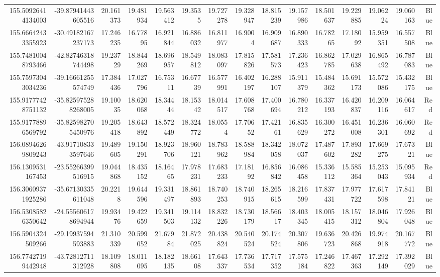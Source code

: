 \begin{center}
\begin{longtable}{rrrrrrrrrrrrrrr}
155.50926414134003 & -39.87941443605516 & 20.161373 & 19.481934 & 19.563412 & 19.3535 & 19.727278 & 19.328947 & 18.815239 & 19.157986 & 18.501637 & 19.229885 & 19.06224 & 19.060163 & Blue \\
155.66642433355923 & -30.49182167237173 & 17.246235 & 16.77895 & 16.921844 & 16.886032 & 16.811977 & 16.9004 & 16.909687 & 16.890333 & 16.78265 & 17.18092 & 15.959351 & 16.557508 & Blue \\
155.74810048793466 & -42.82746318744498 & 19.23729 & 18.844269 & 18.696957 & 18.549812 & 18.083097 & 17.815826 & 17.581573 & 17.236423 & 16.862785 & 17.029638 & 16.865492 & 16.787083 & Blue \\
155.75973043034236 & -39.16661255574749 & 17.384436 & 17.027796 & 16.75311 & 16.67739 & 16.577991 & 16.402197 & 16.288107 & 15.911379 & 15.484362 & 15.691173 & 15.572086 & 15.432175 & Blue \\
155.91777428751132 & -35.825975288268005 & 19.10035 & 18.620068 & 18.34444 & 18.15342 & 18.014517 & 17.608768 & 17.400694 & 16.780212 & 16.337193 & 16.420837 & 16.209116 & 16.064617 & Red \\
155.91778896569792 & -35.825982705450976 & 19.205418 & 18.643892 & 18.572449 & 18.324772 & 18.0554 & 17.70652 & 17.42161 & 16.835629 & 16.300272 & 16.451008 & 16.236301 & 16.060692 & Red \\
156.08946269809243 & -43.917108333597646 & 19.489605 & 19.150291 & 18.923706 & 18.960121 & 18.783962 & 18.588984 & 18.342058 & 18.072037 & 17.487602 & 17.893282 & 17.669275 & 17.67321 & Blue \\
156.1309531167453 & -23.55266399516915 & 19.044868 & 18.435152 & 18.16465 & 17.978231 & 17.683233 & 17.18192 & 16.856842 & 16.086458 & 15.336112 & 15.585364 & 15.253043 & 15.095934 & Red \\
156.30609371925286 & -35.67130335611048 & 20.2218 & 19.644596 & 19.331497 & 18.861893 & 18.740253 & 18.740915 & 18.265615 & 18.216599 & 17.837431 & 17.977722 & 17.617598 & 17.84121 & Blue \\
156.53085826350642 & -24.555606178694944 & 19.93476 & 19.422659 & 19.341503 & 19.114132 & 18.832226 & 18.730179 & 18.56617 & 18.403345 & 18.005415 & 18.157312 & 18.046804 & 17.926048 & Blue \\
156.5904324509266 & -29.19937594593883 & 21.310339 & 20.599052 & 21.67984 & 21.872025 & 20.438824 & 20.540524 & 20.174524 & 20.307806 & 19.636723 & 20.426868 & 19.974918 & 20.167772 & Blue \\
156.77427199442948 & -43.72812711312928 & 18.109808 & 18.011095 & 18.182135 & 18.66108 & 17.643337 & 17.736534 & 17.717352 & 17.575184 & 17.246822 & 17.467363 & 17.292149 & 17.392029 & Blue \\

\end{longtable}
\end{center}
